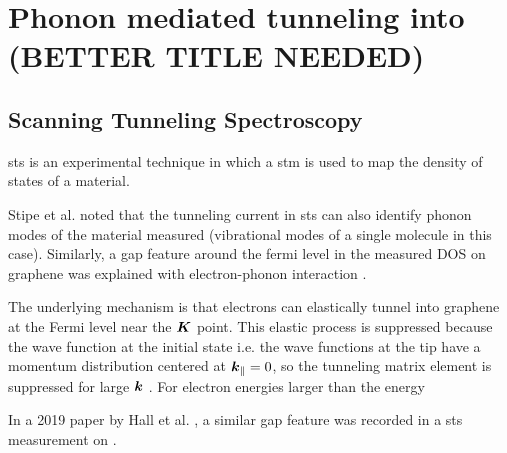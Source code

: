 \documentclass[main.tex]{subfiles}
\begin{document}
\chapter{Phonon mediated tunneling into \TaS (BETTER TITLE NEEDED)}\label{ch:sts_gap_tas2}

\section{Scanning Tunneling Spectroscopy}

\acrfull{sts} is an experimental technique in which a \acrfull{stm} is used to map the density of states of a material.


Stipe et al. noted that the tunneling current in \acrshort{sts} can also identify phonon modes of the material measured \cite{stipe_single-molecule_1998} (vibrational modes of a single molecule in this case).
Similarly, a gap feature around the fermi level in the measured DOS on graphene \cite{zhang_giant_2008} was explained with electron-phonon interaction \cite{wehling_phonon-mediated_2008}.

The underlying mechanism is that electrons can elastically tunnel into graphene at the Fermi level near the \(\vb*{K}\) point. 
This elastic process is suppressed because the wave function at the initial state i.e. the wave functions at the tip have a momentum distribution centered at \(\vb*{k}_{\parallel} = 0\), so the tunneling matrix element is suppressed for large \(\vb*{k}\) \cite{vitali_phonon_2004}.
For electron energies larger than the energy 

In a 2019 paper by Hall et al. \cite{hall_environmental_2019}, a similar gap feature was recorded in a \acrshort{sts} measurement on \TaS.
\end{document}
